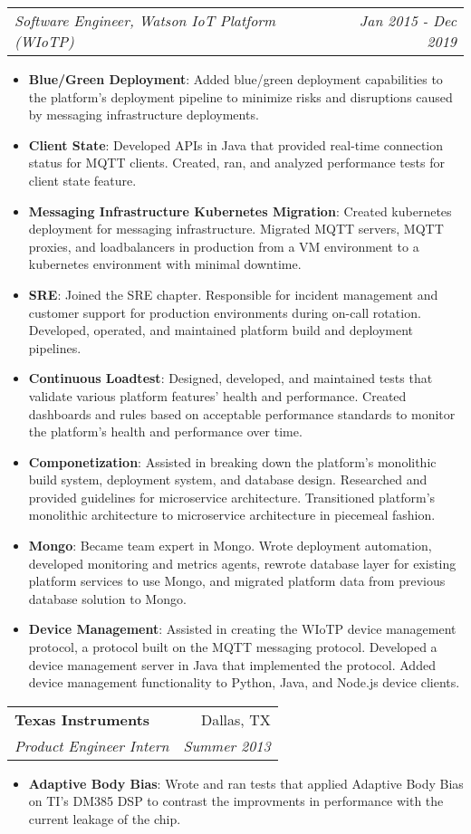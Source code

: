\documentclass[letterpaper,11pt]{article}
\makeatletter
\newcommand{\resumeItem}[2]{
  \item\small{
    \textbf{#1}{: #2 \vspace{-2pt}}
  }
}
\newcommand{\resumeSubheading}[4]{
  \vspace{-1pt}\item
    \begin{tabular*}{0.97\textwidth}[t]{l@{\extracolsep{\fill}}r}
      \textbf{#1} & #2 \\
      \textit{\small#3} & \textit{\small #4} \\
    \end{tabular*}\vspace{-5pt}
}
\newcommand{\resumeSubheadingContinue}[2]{
  \vspace{-1pt}
    \begin{tabular*}{0.97\textwidth}[t]{l@{\extracolsep{\fill}}r}
      \textit{\small#1} & \textit{\small #2} \\
    \end{tabular*}\vspace{-5pt}
}
\newcommand{\resumeItemListStart}{\begin{itemize}}
\newcommand{\resumeItemListEnd}{\end{itemize}\vspace{-5pt}}
\makeatother
\begin{document}
      \resumeSubheadingContinue
        {Software Engineer, Watson IoT Platform (WIoTP)}{Jan 2015 - Dec 2019}
        \resumeItemListStart
          \resumeItem{Blue/Green Deployment}
            {Added blue/green deployment capabilities to the platform's deployment pipeline to minimize risks and disruptions caused by messaging infrastructure deployments.}
          \resumeItem{Client State}
            {Developed APIs in Java that provided real-time connection status for MQTT clients. Created, ran, and analyzed performance tests for client state feature.}
          \resumeItem{Messaging Infrastructure Kubernetes Migration}
            {Created kubernetes deployment for messaging infrastructure. Migrated MQTT servers, MQTT proxies, and loadbalancers in production from a VM environment to a kubernetes environment with minimal downtime.}
          \resumeItem{SRE}
            {Joined the SRE chapter. Responsible for incident management and customer support for production environments during on-call rotation. Developed, operated, and maintained platform build and deployment pipelines.}
          \resumeItem{Continuous Loadtest}
            {Designed, developed, and maintained tests that validate various platform features' health and performance. Created dashboards and rules based on acceptable performance standards to monitor the platform's health and performance over time.}
          \resumeItem{Componetization}
            {Assisted in breaking down the platform's monolithic build system, deployment system, and database design. Researched and provided guidelines for microservice architecture. Transitioned platform's monolithic architecture to microservice architecture in piecemeal fashion.}
          \resumeItem{Mongo}
            {Became team expert in Mongo. Wrote deployment automation, developed monitoring and metrics agents, rewrote database layer for existing platform services to use Mongo, and migrated platform data from previous database solution to Mongo.}
          \resumeItem{Device Management}
            {Assisted in creating the WIoTP device management protocol, a protocol built on the MQTT messaging protocol. Developed a device management server in Java that implemented the protocol. Added device management functionality to Python, Java, and Node.js device clients.}
        \resumeItemListEnd
  
    \resumeSubheading
      {Texas Instruments}{Dallas, TX}
      {Product Engineer Intern}{Summer 2013}
      \resumeItemListStart
        \resumeItem{Adaptive Body Bias}
          {Wrote and ran tests that applied Adaptive Body Bias on TI's DM385 DSP to contrast the improvments in performance with the current leakage of the chip.}
      \resumeItemListEnd
\end{document}
